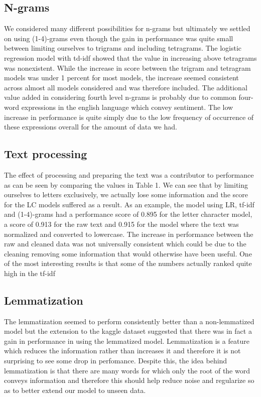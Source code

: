 \documentclass{amsart}
\theoremstyle{definition}
\theoremstyle{remark}
\numberwithin{equation}{section}
\begin{document}
\subsection{N-grams}
We considered many different possibilities for n-grams but ultimately we settled on using (1-4)-grams even though the gain in performance was quite small between limiting ourselves to trigrams and including tetragrams.  The logistic regression model with td-idf showed that the value in increasing above tetragrams was nonexistent.  While the increase in score between the trigram and tetragram models was under 1 percent for most models, the increase seemed consistent across almost all models considered and was therefore included.  The additional value added in considering fourth level n-grams is probably due to common four-word expressions in the english language which convey sentiment.  The low increase in performance is quite simply due to the low frequency of occurrence of these expressions overall for the amount of data we had.
\subsection{Text processing}
The effect of processing and preparing the text was a contributor to performance as can be seen by comparing the values in Table 1.  We can see that by limiting ourselves to letters exclusively, we actually lose some information and the score for the LC models suffered as a result.  As an example, the model using LR, tf-idf and (1-4)-grams had a performance score of 0.895 for the letter character model, a score of 0.913 for the raw text and 0.915 for the model where the text was normalized and converted to lowercase.  The increase in performance between the raw and cleaned data was not universally consistent which could be due to the cleaning removing some information that would otherwise have been useful.  One of the most interesting results is that some of the numbers actually ranked quite high in the tf-idf
\subsection{Lemmatization}
The lemmatization seemed to perform consistently better than a non-lemmatized model but the extension to the kaggle dataset suggested that there was in fact a gain in performance in using the lemmatized model.  Lemmatization is a feature which reduces the information rather than increases it and therefore it is not surprising to see some drop in perfomance.  Despite this, the idea behind lemmatization is that there are many words for which only the root of the word conveys information and therefore this should help reduce noise and regularize so as to better extend our model to unseen data.
\end{document}
